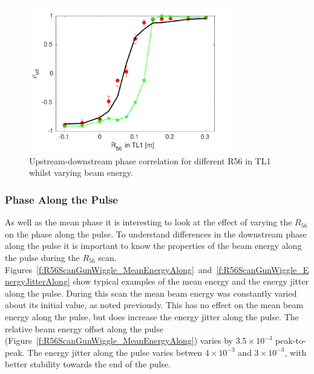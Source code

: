 \begin{figure}
  \centering
  \includegraphics[width=0.8\textwidth]{Figures/propagation/R56ScanGunWiggle_Correl}
  \caption{Upstream-downstream phase correlation for different R56 in TL1 whilst varying beam energy.}
  \label{f:R56ScanGunWiggle_Correl}
\end{figure}


\subsubsection{Phase Along the Pulse}

As well as the mean phase it is interesting to look at the effect of varying the \(R_{56}\) on the phase along the pulse. To understand differences in the downstream phase along the pulse it is important to know the properties of the beam energy along the pulse during the \(R_{56}\) scan. Figures~\ref{f:R56ScanGunWiggle_MeanEnergyAlong}~and~\ref{f:R56ScanGunWiggle_EnergyJitterAlong} show typical examples of the mean energy and the energy jitter along the pulse. During this scan the mean beam energy was constantly varied about its initial value, as noted previously. This has no effect on the mean beam energy along the pulse, but does increase the energy jitter along the pulse. The relative beam energy offset along the pulse (Figure~\ref{f:R56ScanGunWiggle_MeanEnergyAlong}) varies by \(3.5\times10^{-3}\) peak-to-peak. The energy jitter along the pulse varies betwen \(4\times10^{-3}\) and \(3\times10^{-3}\), with better stability towards the end of the pulse.

